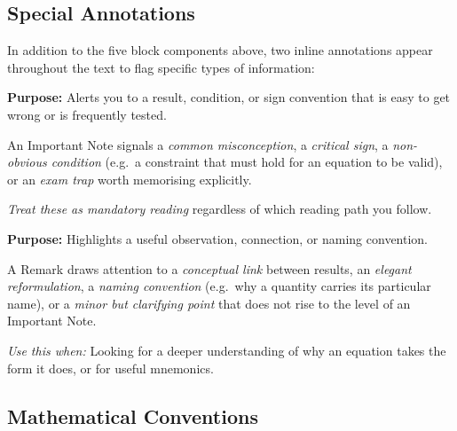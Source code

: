 \bigskip \bigskip
\subsection*{Special Annotations}

In addition to the five block components above, two inline annotations appear
throughout the text to flag specific types of information:

\bigskip

\noindent
\begin{minipage}{0.9\textwidth}
  \begin{importantnote}
    \textbf{Purpose:} Alerts you to a result, condition, or sign convention that is
    easy to get wrong or is frequently tested.

    An Important Note signals a \emph{common misconception}, a \emph{critical sign},
    a \emph{non-obvious condition} (e.g.\ a constraint that must hold for an
    equation to be valid), or an \emph{exam trap} worth memorising explicitly.

    \smallskip
    \textit{Treat these as mandatory reading} regardless of which reading path you follow.
  \end{importantnote}
\end{minipage}

\bigskip

\noindent
\begin{minipage}{0.9\textwidth}
  \begin{remark}
    \textbf{Purpose:} Highlights a useful observation, connection, or naming convention.

    A Remark draws attention to a \emph{conceptual link} between results, an
    \emph{elegant reformulation}, a \emph{naming convention} (e.g.\ why a quantity
    carries its particular name), or a \emph{minor but clarifying point} that does
    not rise to the level of an Important Note.

    \smallskip
    \textit{Use this when:} Looking for a deeper understanding of why an equation
    takes the form it does, or for useful mnemonics.
  \end{remark}
\end{minipage}

\bigskip\bigskip
\subsection*{Mathematical Conventions}

